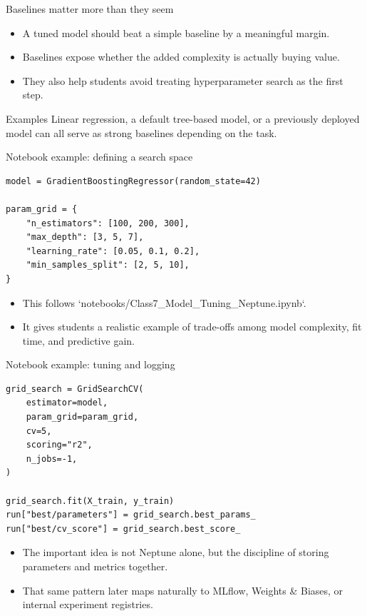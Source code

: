 \begin{frame}{Baselines matter more than they seem}
\begin{itemize}
\item A tuned model should beat a simple baseline by a meaningful margin.
\item Baselines expose whether the added complexity is actually buying value.
\item They also help students avoid treating hyperparameter search as the first step.
\end{itemize}
\begin{block}{Examples}
Linear regression, a default tree-based model, or a previously deployed model can all serve as strong baselines depending on the task.
\end{block}
\coursefooter
\end{frame}

\begin{frame}[fragile]{Notebook example: defining a search space}
\begin{lstlisting}[style=coursepython]
model = GradientBoostingRegressor(random_state=42)

param_grid = {
    "n_estimators": [100, 200, 300],
    "max_depth": [3, 5, 7],
    "learning_rate": [0.05, 0.1, 0.2],
    "min_samples_split": [2, 5, 10],
}
\end{lstlisting}
\begin{itemize}
\item This follows `notebooks/Class7_Model_Tuning_Neptune.ipynb`.
\item It gives students a realistic example of trade-offs among model complexity, fit time, and predictive gain.
\end{itemize}
\coursefooter
\end{frame}

\begin{frame}[fragile]{Notebook example: tuning and logging}
\begin{lstlisting}[style=coursepython]
grid_search = GridSearchCV(
    estimator=model,
    param_grid=param_grid,
    cv=5,
    scoring="r2",
    n_jobs=-1,
)

grid_search.fit(X_train, y_train)
run["best/parameters"] = grid_search.best_params_
run["best/cv_score"] = grid_search.best_score_
\end{lstlisting}
\begin{itemize}
\item The important idea is not Neptune alone, but the discipline of storing parameters and metrics together.
\item That same pattern later maps naturally to MLflow, Weights \& Biases, or internal experiment registries.
\end{itemize}
\coursefooter
\end{frame}

